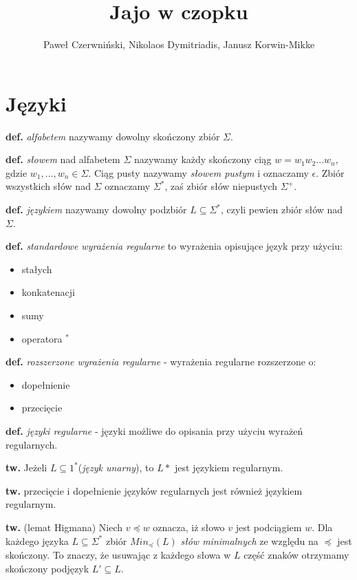 \documentclass[draft]{article}
\title{Jajo w czopku}
\author{Paweł Czerwniński, Nikolaos Dymitriadis, Janusz Korwin-Mikke}
\newcommand{\tw}{\textbf{tw. }}
\newcommand{\deff}{\textbf{def. }}
\begin{document}
\maketitle

\section{Języki}
	\deff \textit{alfabetem} nazywamy dowolny skończony zbiór $\Sigma$.
	
	\deff \textit{słowem} nad alfabetem $\Sigma$ nazywamy każdy skończony ciąg $w = w_1 w_2 ... w_n$, gdzie $w_1,..., w_n \in \Sigma$. Ciąg pusty nazywamy \textit{słowem pustym} i oznaczamy $\epsilon$. Zbiór wszystkich słów nad $\Sigma$ oznaczamy $\Sigma^*$, zaś zbiór słów niepustych $\Sigma^+$.
	
	\deff \textit{językiem} nazywamy dowolny podzbiór $L \subseteq \Sigma^*$, czyli pewien zbiór słów nad $\Sigma$.
	
	\deff {} \textit{standardowe wyrażenia regularne} to wyrażenia opisujące język przy użyciu:
	\begin{itemize}
		\item stałych
		\item konkatenacji
		\item sumy
		\item operatora $^*$
	\end{itemize}
	
	\deff \textit{rozszerzone wyrażenia regularne} - wyrażenia regularne rozszerzone o:
	\begin{itemize}
		\item dopełnienie
		\item przecięcie
	\end{itemize}
	
	\deff {}\textit{języki regularne} - języki możliwe do opisania przy użyciu wyrażeń regularnych.
	
	\tw Jeżeli $L \subseteq 1^*$(\textit{język unarny}), to $L*$ jest językiem regularnym.
	
	\tw przecięcie i dopełnienie języków regularnych jest również językiem regularnym.
	
	\tw (lemat Higmana) Niech $v \preceq w$ oznacza, iż słowo $v$ jest podciągiem $w$. Dla każdego języka $L \subseteq \Sigma^*$ zbiór $Min_\preceq(L)$ \textit{słów minimalnych} ze względu na $\preceq$ jest skończony. To znaczy, że usuwając z każdego słowa w $L$ część znaków otrzymamy skończony podjęzyk $L' \subseteq L$.
	
\end{document}
